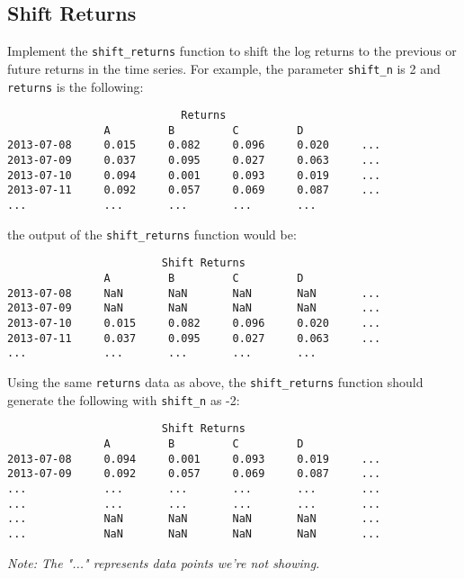 \documentclass[11pt]{article}
\begin{document}
    
    
    \subsection{Shift Returns}\label{shift-returns}

Implement the \texttt{shift\_returns} function to shift the log returns
to the previous or future returns in the time series. For example, the
parameter \texttt{shift\_n} is 2 and \texttt{returns} is the following:

\begin{verbatim}
                           Returns
               A         B         C         D
2013-07-08     0.015     0.082     0.096     0.020     ...
2013-07-09     0.037     0.095     0.027     0.063     ...
2013-07-10     0.094     0.001     0.093     0.019     ...
2013-07-11     0.092     0.057     0.069     0.087     ...
...            ...       ...       ...       ...
\end{verbatim}

the output of the \texttt{shift\_returns} function would be:

\begin{verbatim}
                        Shift Returns
               A         B         C         D
2013-07-08     NaN       NaN       NaN       NaN       ...
2013-07-09     NaN       NaN       NaN       NaN       ...
2013-07-10     0.015     0.082     0.096     0.020     ...
2013-07-11     0.037     0.095     0.027     0.063     ...
...            ...       ...       ...       ...
\end{verbatim}

Using the same \texttt{returns} data as above, the
\texttt{shift\_returns} function should generate the following with
\texttt{shift\_n} as -2:

\begin{verbatim}
                        Shift Returns
               A         B         C         D
2013-07-08     0.094     0.001     0.093     0.019     ...
2013-07-09     0.092     0.057     0.069     0.087     ...
...            ...       ...       ...       ...       ...
...            ...       ...       ...       ...       ...
...            NaN       NaN       NaN       NaN       ...
...            NaN       NaN       NaN       NaN       ...
\end{verbatim}

\emph{Note: The "..." represents data points we're not showing.}
\end{document}
